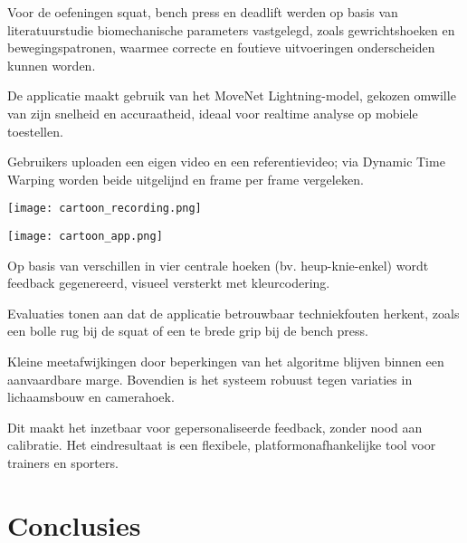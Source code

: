 \documentclass[a0,portrait]{hogent-poster}
\begin{document}
\begin{multicols}{2}
\noindent
\begin{minipage}[t]{0.48\linewidth}

 Voor de oefeningen squat, bench press en deadlift werden op basis van literatuurstudie biomechanische parameters vastgelegd, zoals gewrichtshoeken en bewegingspatronen, waarmee correcte en foutieve uitvoeringen onderscheiden kunnen worden. 

 De applicatie maakt gebruik van het MoveNet Lightning-model, gekozen omwille van zijn snelheid en accuraatheid, ideaal voor realtime analyse op mobiele toestellen. 

 Gebruikers uploaden een eigen video en een referentievideo; via Dynamic Time Warping worden beide uitgelijnd en frame per frame vergeleken. 

 

 \end{minipage}
\hfill
\begin{minipage}[t]{0.48\linewidth}
\texttt{[image: cartoon\_recording.png]}
\end{minipage}
\vspace{1em}


\noindent
\begin{minipage}[t]{0.48\linewidth}
\texttt{[image: cartoon\_app.png]}
\end{minipage}
\hfill
\begin{minipage}[t]{0.48\linewidth}

Op basis van verschillen in vier centrale hoeken (bv. heup-knie-enkel) wordt feedback gegenereerd, visueel versterkt met kleurcodering. 

 Evaluaties tonen aan dat de applicatie betrouwbaar techniekfouten herkent, zoals een bolle rug bij de squat of een te brede grip bij de bench press. 

 Kleine meetafwijkingen door beperkingen van het algoritme blijven binnen een aanvaardbare marge. Bovendien is het systeem robuust tegen variaties in lichaamsbouw en camerahoek.

 Dit maakt het inzetbaar voor gepersonaliseerde feedback, zonder nood aan calibratie. Het eindresultaat is een flexibele, platformonafhankelijke tool voor trainers en sporters.

 \end{minipage}
\vspace{1em}

\section{Conclusies}


\end{multicols}
\end{document}
